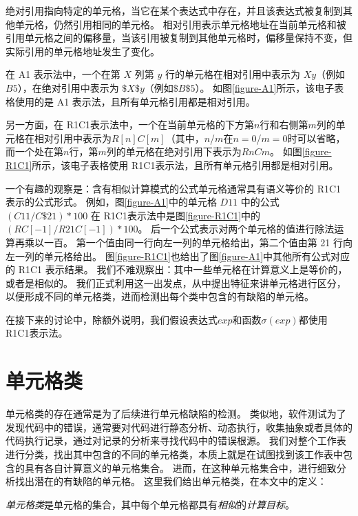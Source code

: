 绝对引用指向特定的单元格，当它在某个表达式中存在，并且该表达式被复制到其他单元格，仍然引用相同的单元格。
相对引用表示单元格地址在当前单元格和被引用单元格之间的偏移量，当该引用被复制到其他单元格时，偏移量保持不变，但实际引用的单元格地址发生了变化。

在 A1 表示法中，一个在第 $X$ 列第 $y$ 行的单元格在相对引用中表示为 $Xy$（例如$B5$），在绝对引用中表示为 $\$X\$y$（例如$\$B\$5$）。
如图\ref{figure-A1}所示，该电子表格使用的是 A1 表示法，且所有单元格引用都是相对引用。

另一方面，在 R1C1表示法中，一个在当前单元格的下方第$n$行和右侧第$m$列的单元格在相对引用中表示为$R[n]C[m]$（其中，$n$/$m$在$n=0$/$m=0$时可以省略，而一个处在第$n$行，第$m$列的单元格在绝对引用下表示为$RnCm$。
如图\ref{figure-R1C1}所示，该电子表格使用 R1C1表示法，且所有单元格引用都是相对引用。

一个有趣的观察是：含有相似计算模式的公式单元格通常具有语义等价的 R1C1 表示的公式形式。
例如，图\ref{figure-A1}中的单元格 $D11$ 中的公式$(C11/C\$21)*100$ 在 R1C1表示法中是图\ref{figure-R1C1}中的$(RC[-1]/R21C[-1])*100$。
后一个公式表示对两个单元格的值进行除法运算再乘以一百。
第一个值由同一行向左一列的单元格给出，第二个值由第 21 行向左一列的单元格给出。
图\ref{figure-R1C1}也给出了图\ref{figure-A1}中其他所有公式对应的 R1C1 表示结果。
我们不难观察出：其中一些单元格在计算意义上是等价的，或者是相似的。
我们正式利用这一出发点，从中提出特征来讲单元格进行区分，以便形成不同的单元格类，进而检测出每个类中包含的有缺陷的单元格。

在接下来的讨论中，除额外说明，我们假设表达式$exp$和函数$\sigma(exp)$都使用 R1C1表示法。

\section{单元格类}

单元格类的存在通常是为了后续进行单元格缺陷的检测。
类似地，软件测试为了发现代码中的错误，通常要对代码进行静态分析、动态执行，收集抽象或者具体的代码执行记录，通过对记录的分析来寻找代码中的错误根源。
我们对整个工作表进行分类，找出其中包含的不同的单元格类，本质上就是在试图找到该工作表中包含的具有各自计算意义的单元格集合。
进而，在这种单元格集合中，进行细致分析找出潜在的有缺陷的单元格。
这里我们给出单元格类，在本文中的定义：

\begin{definition}
    \textit{单元格类}是单元格的集合，其中每个单元格都具有\textit{相似}的\textit{计算目标}。
\end{definition}


